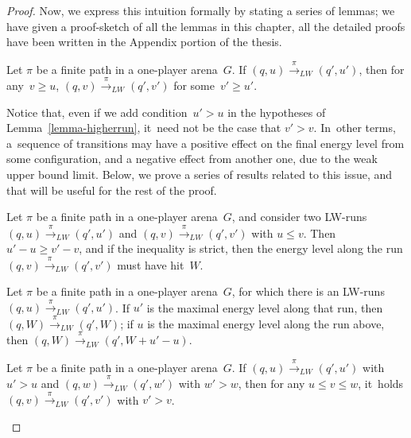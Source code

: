 \begin{proof}
  Now, we express this intuition formally by stating a series of lemmas; we have given a proof-sketch of all the lemmas in this chapter, all the detailed proofs have been written in the Appendix portion of the thesis.\\
\vskip 1cm
\begin{lemma}
\label{lemma-higherrun}
Let $\pi$ be a finite path in a one-player arena~$G$. 
If $(q,u) \xrightarrow{\pi}_{LW} (q',u')$, then for any~$v\geq u$,
$(q,v) \xrightarrow{\pi}_{LW} (q',v')$ for some~$v'\geq u'$.
\end{lemma}

Notice that, even if we add condition~$u'>u$ in the
hypotheses of Lemma~\ref{lemma-higherrun}, it~need not be the case that
$v'>v$. In~other terms, a~sequence of transitions may have a positive
effect on the final energy level from some configuration, and a negative effect from another one, due to the weak upper bound limit.
Below, we prove a series of results related to this issue, and that
will be useful for the rest of the proof.

\vskip 0.5cm
\begin{lemma}
\label{lemma-hitW}
  Let $\pi$ be a finite path in a one-player arena~$G$, and consider two LW-runs $(q,u)\xrightarrow{\pi}_{LW} (q',u')$ and $(q,v)\xrightarrow{\pi}_{LW}(q',v')$ with $u\leq
  v$. Then $u'-u\geq v'-v$, and if the inequality is strict, then
  the energy level along the run $(q,v)\xrightarrow{\pi}_{LW}(q',v')$ must have hit~$W$.
\end{lemma}

\vskip 0.5cm
\begin{lemma}
\label{lemma-W}
  Let $\pi$ be a finite path in a one-player arena~$G$, for which there
  is an LW-runs $(q,u)\xrightarrow{\pi}_{LW} (q',u')$. 
  If $u'$ is the maximal energy level along that run, then
  $(q,W)\xrightarrow{\pi}_{LW} (q',W)$;
  if $u$ is the maximal energy level along the run above, then
  $(q,W)\xrightarrow{\pi}_{LW} (q',W+u'-u)$.
\end{lemma}

\vskip 0.5cm
\begin{lemma}\label{lemma-iteratepos}
  Let $\pi$ be a finite path in a one-player arena~$G$.
  If
  $(q,u)\xrightarrow{\pi}_{LW} (q',u')$ with $u'> u$
  and 
  $(q,w)\xrightarrow{\pi}_{LW} (q',w')$ with $w'> w$,
  then
  for any $u\leq v\leq w$, it~holds
  $(q,v)\xrightarrow{\pi}_{LW} (q',v')$ with $v'> v$.
\end{lemma}


\end{proof}
